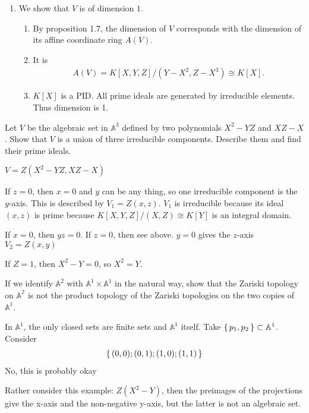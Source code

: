 \begin{solution}
\begin{enumerate}
\begin{enumerate}
        \end{enumerate}
        \item We show that \(V\) is of dimension \(1\).
        \begin{enumerate}
            \item By proposition 1.7, the dimension of \(V\) corresponds with the dimension of its affine coordinate ring \(A(V)\).
            \item It is
            \begin{align*}
                A(V) = K[X, Y, Z] / (Y-X^2, Z-X^3) \cong K[X].
            \end{align*}
            \item \(K[X]\) is a PID. All prime ideals are generated by irreducible elements. Thus dimension is 1.
        \end{enumerate}
    \end{enumerate}
\end{solution}


\begin{exercise}[1.3.]
    Let \(V\) be the algebraic set in \(\mathbb{A}^3\) defined by two polynomials \(X^2 - YZ\) and \(XZ - X\). Show that \(V\) is a union of three irreducible components. Describe them and find their prime ideals.
\end{exercise}
\begin{solution}
    \(V = Z(X^2 - YZ, XZ - X)\)

    If \(z = 0\), then \(x = 0\) and \(y\) can be any thing, so one irreducible component is the \(y\)-axis. This is described by \(V_1 = Z(x, z)\). \(V_1\) is irreducible because its ideal \((x, z)\) is prime because \(K[X, Y, Z] / (X, Z) \cong K[Y]\) is an integral domain.

    If \(x = 0\), then \(yz = 0\). If \(z = 0\), then see above. \(y = 0\) gives the \(z\)-axis \(V_2 = Z(x, y)\)

    If \(Z = 1\), then \(X^2 - Y = 0\), so \(X^2 = Y\).
\end{solution}

    

\begin{exercise}
    If we identify \(\mathbb{A}^2\) with \(\mathbb{A}^1 \times \mathbb{A}^1\) in the natural way, show that the Zariski topology on \(\mathbb{A^2}\) is not the product topology of the Zariski topologies on the two copies of \(\mathbb{A}^1\).
\end{exercise}
\begin{solution}
    In \(\mathbb{A}^1\), the only closed sets are finite sets and \(\mathbb{A}^1\) itself. Take \(\left\{\, p_1, p_2 \,\right\} \subset \mathbb{A}^1\). Consider
    \begin{align*}
        \left\{\, (0, 0); (0, 1); (1, 0); (1, 1) \,\right\}
    \end{align*}
    No, this is probably okay

    Rather consider this example: \(Z(X^2 - Y)\), then the preimages of the projections give the x-axis and the non-negative y-axis, but the latter is not an algebraic set.
\end{solution}